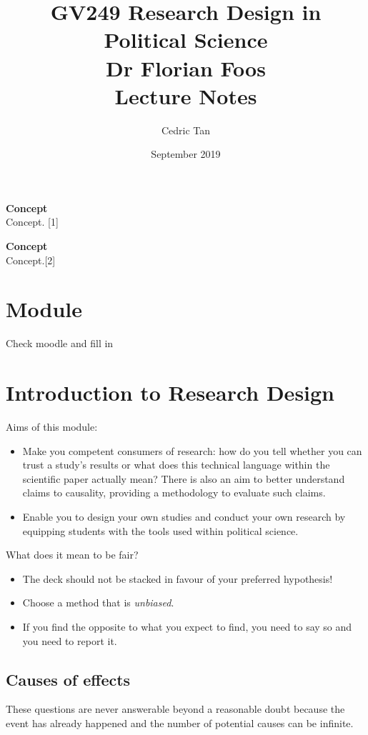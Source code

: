 \documentclass[12pt, letterpaper]{article}
\title{
	{GV249 Research Design in Political Science}\\
	{\large{Dr Florian Foos}}\\
	{\large{Lecture Notes}}
}
\author{Cedric Tan}
\date{September 2019}
\begin{document}
\maketitle
{\small
  \noindent\textbf{Concept}\\
  Concept. \hspace*{\fill}[1]

  \vspace{10pt}
  \noindent\textbf{Concept}\\
  Concept.\hspace*{\fill}[2]

\newpage
\tableofcontents
\newpage

\section{Module}
Check moodle and fill in

\section{Introduction to Research Design}
Aims of this module:
\begin{itemize}
	\item Make you competent consumers of research: how do you tell whether you can trust a study's results or what does this technical language within the scientific paper actually mean? There is also an aim to better understand claims to causality, providing a methodology to evaluate such claims.
	\item Enable you to design your own studies and conduct your own research by equipping students with the tools used within political science. 
\end{itemize}

What does it mean to be fair?
\begin{itemize}
	\item The deck should not be stacked in favour of your preferred hypothesis!
	\item Choose a method that is \textit{unbiased}.
	\item If you find the opposite to what you expect to find, you need to say so and you need to report it.

\end{itemize}
\subsection{Causes of effects}
These questions are never answerable beyond a reasonable doubt because the event has already happened and the number of potential causes can be infinite.

}
\end{document}
